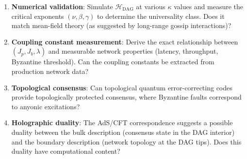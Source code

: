 \documentclass[12pt,a4paper,twocolumn]{article}
\newcommand{\Hdag}{\mathcal{H}_{\mathrm{DAG}}}
\newcommand{\kparam}{\kappa}
\begin{document}
\begin{enumerate}[leftmargin=*,itemsep=2pt]
\item \textbf{Numerical validation}: Simulate $\Hdag$ at various $\kparam$ values and measure the critical exponents $(\nu, \beta, \gamma)$ to determine the universality class. Does it match mean-field theory (as suggested by long-range gossip interactions)?

\item \textbf{Coupling constant measurement}: Derive the exact relationship between $(J_p, J_b, \lambda)$ and measurable network properties (latency, throughput, Byzantine threshold). Can the coupling constants be extracted from production network data?

\item \textbf{Topological consensus}: Can topological quantum error-correcting codes provide topologically protected consensus, where Byzantine faults correspond to anyonic excitations?

\item \textbf{Holographic duality}: The AdS/CFT correspondence suggests a possible duality between the bulk description (consensus state in the DAG interior) and the boundary description (network topology at the DAG tips). Does this duality have computational content?
\end{enumerate}
\end{document}
